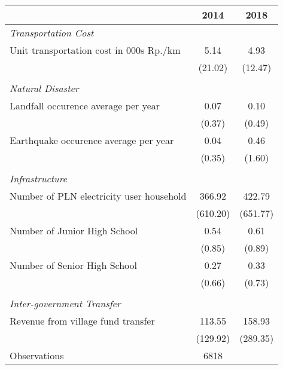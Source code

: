\begin{tabular}{l*{2}{c}}
\hline\hline
                    &        2014&        2018\\
\hline
\emph{Transportation Cost}&            &            \\
\hspace{0.25cm} Unit transportation cost in 000s Rp./km&        5.14&        4.93\\
                    &     (21.02)&     (12.47)\\
\vspace{0.05em} \\ \emph{Natural Disaster}&            &            \\
\hspace{0.25cm} Landfall occurence average per year&        0.07&        0.10\\
                    &      (0.37)&      (0.49)\\
\hspace{0.25cm} Earthquake occurence average per year&        0.04&        0.46\\
                    &      (0.35)&      (1.60)\\
\vspace{0.05em} \\ \emph{Infrastructure}&            &            \\
\hspace{0.25cm} Number of PLN electricity user household&      366.92&      422.79\\
                    &    (610.20)&    (651.77)\\
\hspace{0.25cm} Number of Junior High School&        0.54&        0.61\\
                    &      (0.85)&      (0.89)\\
\hspace{0.25cm} Number of Senior High School&        0.27&        0.33\\
                    &      (0.66)&      (0.73)\\
\vspace{0.05em} \\ \emph{Inter-government Transfer}&            &            \\
\hspace{0.25cm} Revenue from village fund transfer&      113.55&      158.93\\
                    &    (129.92)&    (289.35)\\
\hline
Observations        &        6818&            \\
\hline\hline
\end{tabular}
